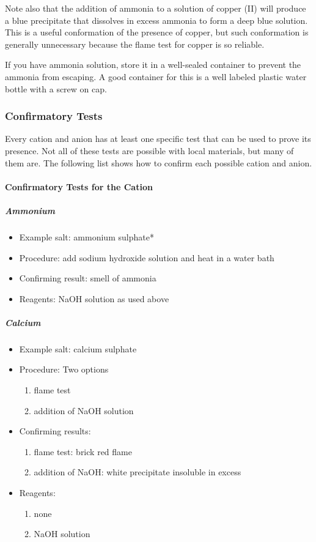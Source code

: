 Note also that the addition of ammonia to a solution of copper (II) will produce a blue precipitate that dissolves in excess ammonia to form a deep blue solution. This is a useful conformation of the presence of copper, but such conformation is generally unnecessary because the flame test for copper is so reliable.

If you have ammonia solution, store it in a well-sealed container to prevent the ammonia from escaping. A good container for this is a well labeled plastic water bottle with a screw on cap.

\subsubsection{Confirmatory Tests}
\setcounter{secnumdepth}{4}

Every cation and anion has at least one specific test that can be used to prove its presence. Not all of these tests are possible with local materials, but many of them are. The following list shows how to confirm each possible cation and anion.

\paragraph{Confirmatory Tests for the Cation}

\subparagraph{Ammonium}
\begin{itemize}
\item{Example salt: ammonium sulphate*}
\item{Procedure: add sodium hydroxide solution and heat in a water bath}
\item{Confirming result: smell of ammonia} 
\item{Reagents: NaOH solution as used above}
\end{itemize}

\subparagraph{Calcium}
\begin{itemize}
\item{Example salt: calcium sulphate}

\item{Procedure: Two options
\begin{enumerate}
\item{flame test}
\item{addition of NaOH solution}
\end{enumerate}
} %

\item{Confirming results:
\begin{enumerate}
\item{flame test: brick red flame}
\item{addition of NaOH: white precipitate insoluble in excess}
\end{enumerate}
} %

\item{Reagents:
\begin{enumerate}
\item{none}
\item{NaOH solution}
\end{enumerate}
} %

\end{itemize} %

